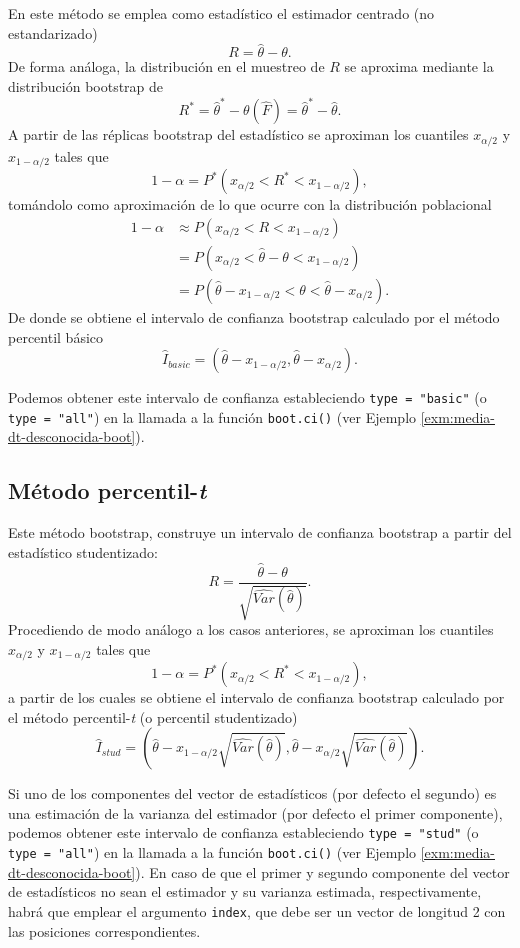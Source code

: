 \documentclass[
  10pt,
]{book}
\theoremstyle{break}
\theoremstyle{nonumberplain}
\begin{document}
En este método se emplea como estadístico el estimador centrado (no estandarizado)
\[R = \hat{\theta}-\theta.\]
De forma análoga, la distribución en el muestreo de \(R\) se aproxima mediante la distribución bootstrap de
\[R^{\ast}= \hat{\theta}^{\ast}-\theta \left( \hat{F} \right) = \hat{\theta}^{\ast}-\hat{\theta}.\]
A partir de las réplicas bootstrap del estadístico se aproximan los cuantiles \(x_{\alpha /2}\) y \(x_{1-\alpha /2}\) tales que
\[1-\alpha = P^{\ast}\left( x_{\alpha /2}<R^{\ast}<x_{1-\alpha /2} \right),\]
tomándolo como aproximación de lo que ocurre con la distribución poblacional
\[\begin{aligned}
1-\alpha &\approx P\left( x_{\alpha /2}<R<x_{1-\alpha /2} \right) \\
&= P\left( x_{\alpha /2} < \hat{\theta}-\theta < x_{1-\alpha /2} \right) \\
&= P\left( \hat{\theta} - x_{1-\alpha /2} < \theta <\hat{\theta} -x_{\alpha /2} \right).
\end{aligned}\]
De donde se obtiene el intervalo de confianza bootstrap calculado
por el método percentil básico
\[\hat{I}_{basic}=\left( \hat{\theta} - x_{1-\alpha /2},\hat{\theta} - x_{\alpha /2} \right).\]

Podemos obtener este intervalo de confianza estableciendo \texttt{type\ =\ "basic"} (o \texttt{type\ =\ "all"}) en la llamada a la función \texttt{boot.ci()} (ver Ejemplo \ref{exm:media-dt-desconocida-boot}).

\hypertarget{boot-ic-stud}{%
\subsection{\texorpdfstring{Método percentil-\emph{t}}{Método percentil-t}}\label{boot-ic-stud}}

Este método bootstrap, construye un intervalo de confianza bootstrap a partir del estadístico studentizado:
\[R = \frac{\hat \theta - \theta}{\sqrt{\widehat{Var}(\hat \theta)}}.\]
Procediendo de modo análogo a los casos anteriores, se aproximan los cuantiles \(x_{\alpha /2}\) y \(x_{1-\alpha /2}\) tales que
\[1-\alpha = P^{\ast}\left( x_{\alpha /2}<R^{\ast}<x_{1-\alpha /2} \right),\]
a partir de los cuales se obtiene el intervalo de confianza bootstrap calculado
por el método percentil-\emph{t} (o percentil studentizado)
\[\hat{I}_{stud}=\left( \hat{\theta} - x_{1-\alpha /2}\sqrt{\widehat{Var}(\hat \theta)},\hat{\theta} - x_{\alpha /2}\sqrt{\widehat{Var}(\hat \theta)} \right).\]

Si uno de los componentes del vector de estadísticos (por defecto el segundo) es una estimación de la varianza del estimador (por defecto el primer componente), podemos obtener este intervalo de confianza estableciendo \texttt{type\ =\ "stud"} (o \texttt{type\ =\ "all"}) en la llamada a la función \texttt{boot.ci()} (ver Ejemplo \ref{exm:media-dt-desconocida-boot}).
En caso de que el primer y segundo componente del vector de estadísticos no sean el estimador y su varianza estimada, respectivamente, habrá que emplear el argumento \texttt{index}, que debe ser un vector de longitud 2 con las posiciones correspondientes.
\end{document}
